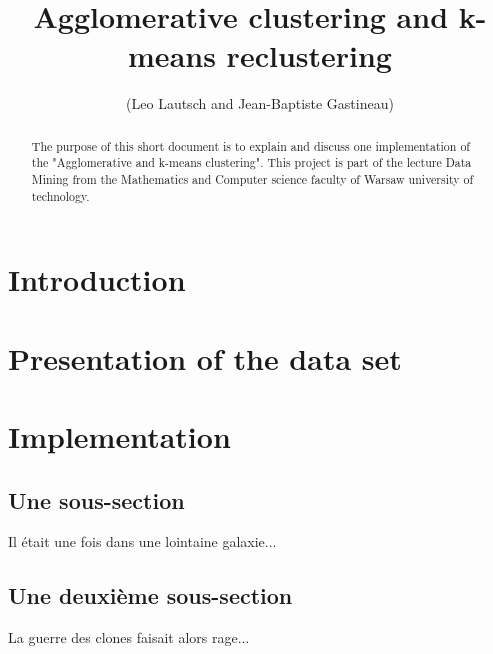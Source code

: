 \documentclass[a4paper]{article}
\begin{document}
\title{Agglomerative clustering and k-means reclustering}
\author{(Leo Lautsch and Jean-Baptiste Gastineau)}
\maketitle



\begin{abstract}
  The purpose of this short document is to explain and discuss one implementation of the "Agglomerative and k-means clustering". This project is part of the lecture Data Mining from the Mathematics and Computer science faculty of Warsaw university of technology.
\end{abstract}


\newpage


\section{Introduction}
\section{Presentation of the data set}
\section{Implementation}
\subsection{Une sous-section}
Il était une fois dans une lointaine galaxie...
\subsection{Une deuxième sous-section}
La guerre des clones faisait alors rage...

\newpage

 \tableofcontents 
\end{document}
